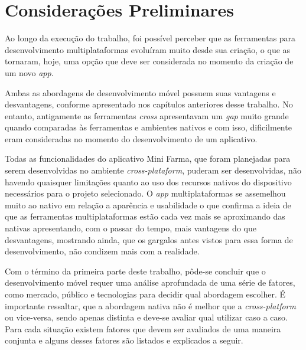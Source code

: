 \chapter{Considerações Preliminares} \label{cap:consideracoespreliminares}

Ao longo da execução do trabalho, foi possível perceber que as ferramentas para desenvolvimento multiplataformas 
evoluíram muito desde sua criação, o que as tornaram, hoje, uma opção que deve ser considerada no momento da criação de um novo \textit{app}.

Ambas as abordagens de desenvolvimento móvel possuem suas vantagens e desvantagens, conforme apresentado nos capítulos anteriores desse trabalho. 
No entanto, antigamente as ferramentas \textit{cross} apresentavam um \textit{gap} muito grande quando comparadas às ferramentas e ambientes nativos e com isso, 
dificilmente eram consideradas no momento do desenvolvimento de um aplicativo.

Todas as funcionalidades do aplicativo Mini Farma, que foram planejadas para serem desenvolvidas no ambiente \textit{cross-plataform}, puderam ser desenvolvidas, não havendo quaisquer limitações 
quanto ao uso dos recursos nativos do dispositivo necessários para o projeto selecionado. O \textit{app} multiplataformas se assemelhou muito 
ao nativo em relação a aparência e usabilidade o que confirma a ideia de que as ferramentas multiplataformas estão cada vez mais se aproximando
das nativas apresentando, com o passar do tempo, mais vantagens do que desvantagens, mostrando ainda, que os gargalos antes vistos para essa forma de desenvolvimento, não condizem
mais com a realidade.

Com o término da primeira parte deste trabalho, pôde-se concluir que o desenvolvimento móvel requer uma análise aprofundada de uma série de fatores, 
como mercado, público e tecnologias para decidir qual abordagem escolher.
É importante ressaltar, que a abordagem nativa não é melhor que a \textit{cross-platform} ou vice-versa, sendo apenas distinta e deve-se avaliar qual utilizar caso a 
caso. Para cada situação existem fatores que devem ser avaliados de uma maneira conjunta e alguns desses fatores são listados e explicados a seguir.

